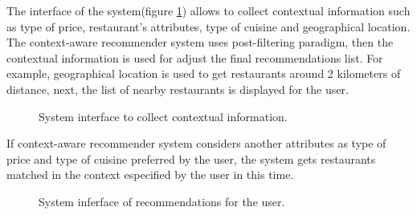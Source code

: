 The interface of the system(figure \ref{fig:context}) allows to
collect contextual information such as type of price, restaurant's
attributes, type of cuisine and geographical location. \\ 
The context-aware recommender system uses post-filtering paradigm, 
then the contextual information is used for adjust the final 
recommendations list. For example, geographical location is used to get restaurants
around 2 kilometers of distance, next, the list of nearby restaurants
is displayed for the user.\\  
\begin{figure}
\captionsetup{justification=centering,margin=2cm,font=footnotesize}
\centering
{}
\caption{System interface to collect contextual information.}
\label{fig:context}   
\end{figure}
If context-aware recommender system
considers another attributes as type of price and type of cuisine
preferred by the user, the system gets restaurants matched in the
context especified by the user in this time. 
\begin{figure}
\captionsetup{font=footnotesize}
\centering
{}
\caption{System inferface of recommendations for the user.}
\label{fig:recom}    
\end{figure}
